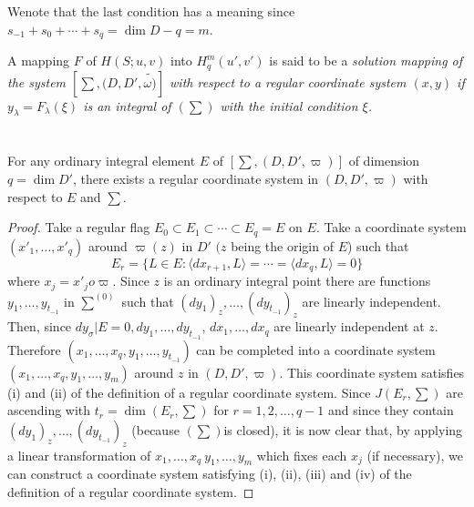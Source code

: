 We\pageoriginale note that the last condition has a meaning since $s_{-1}+ s_0 +
\cdots + s_q = \dim D - q = m$. 
\begin{defi*}
  A mapping $F$ of $H(S; u,  v)$ into $H_q^m (u',  v')$ is said to be a
  \em {solution mapping } of the system $\left[\sum,  (D,  D',
    \tilde{\omega)} \right ]$ with respect to a regular coordinate
  system $(x,  y)$ if $y_ \lambda = F_ \lambda (\xi)$ is an integral
  of $(\sum)$ with the initial condition $\xi$. 
\end{defi*}  

\section{}\label{chap2:sec2.8}

\begin{proposition}\label{chap2:sec2.8:prop14} %
  For any ordinary integral element $E$ of $\left [\sum,  (D,  D',
    \varpi) \right ]$ of dimension $q = \dim D'$,  there exists a
  regular coordinate system in $(D,  D',  \varpi)$ with respect to $E$
  and $\sum$. 
\end{proposition}
 
\begin{proof}
  Take a regular flag $E_0 \subset E_1 \subset \cdots \subset E_q = E$
  on $E$. Take a coordinate system $(x'_1,  \ldots ,  x'_q)$ around
  $\varpi (z)$ in $D'$ $(z$ being the origin of $E$) such that  
  $$
  E_r = \{L \in E : \langle dx_{r+1},  L \rangle = \cdots = \langle
  dx_q,  L \rangle = 0 \} 
  $$
  where $x_j = x'_j o \varpi$. Since $z$ is an ordinary integral point
  there are functions $y_1,  \ldots ,  y_{t_{-1}}$ in $\sum^{(0)}$
  such that $(dy_1)_z,  \ldots ,  (dy_{t_{-1}})_z$ are linearly
  independent. Then,  since $dy_\sigma \big | E = 0,  dy_1 ,  \ldots ,
  dy_{t_{-1}}$,  $dx_1,  \ldots ,  dx_q$ are linearly independent at
  $z$. Therefore $(x_1,  \ldots ,  x_q,  y_1,  \ldots ,  y_{t_{-1}}) $
  can be completed into a coordinate system $(x_1,  \ldots ,  x_q,
  y_1,  \ldots ,  y_m)$ around $z$ in $(D,  D',  \varpi)$. This
  coordinate system satisfies (i) and (ii) of the definition of a
  regular coordinate system.  Since $J (E_r,  \sum)$ are ascending
  with $t_r = \dim (E_r,  \sum)$ for $r= 1,  2,  \ldots ,  q-1$ and
  since they contain $(dy_1)_z,  \ldots ,  (dy_{t_{-1}})_z$ (because
  $(\sum)$\pageoriginale is closed),  it is now clear that,  by applying a linear
  transformation of $x_1,  \ldots ,  x_q ~ y_1,  \ldots ,  y_m$ which
  fixes each $x_j$ (if necessary),  we can construct a coordinate
  system satisfying (i), (ii),  (iii) and (iv) of the
  definition of a regular coordinate system. 
\end{proof} 

